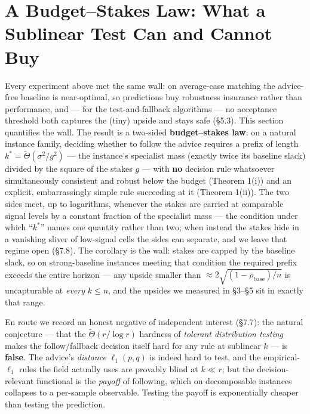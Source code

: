 \section{A Budget--Stakes Law: What a Sublinear Test Can and Cannot
Buy}

Every experiment above met the same wall: on average-case matching the
advice-free baseline is near-optimal, so predictions buy robustness
insurance rather than performance, and --- for the test-and-fallback
algorithms --- no acceptance threshold both captures the (tiny) upside
and stays safe (§5.3). This section quantifies the wall. The result is a
two-sided \textbf{budget--stakes law}: on a natural instance family,
deciding whether to follow the advice requires a prefix of length
\(k^* = \tilde\Theta(\sigma^2/g^2)\) --- the instance's specialist mass
(exactly twice its baseline slack) divided by the square of the stakes
\(g\) --- with \textbf{no} decision rule whatsoever simultaneously
consistent and robust below the budget (Theorem 1(i)) and an explicit,
embarrassingly simple rule succeeding at it (Theorem 1(ii)). The two
sides meet, up to logarithms, whenever the stakes are carried at
comparable signal levels by a constant fraction of the specialist mass
--- the condition under which ``\(k^*\)'' names one quantity rather than
two; when instead the stakes hide in a vanishing sliver of low-signal
cells the sides can separate, and we leave that regime open (§7.8). The
corollary is the wall: stakes are capped by the baseline slack, so on
strong-baseline instances meeting that condition the required prefix
exceeds the entire horizon --- any upside smaller than
\(\approx 2\sqrt{(1-\rho_{\mathrm{base}})/n}\) is uncapturable at
\emph{every} \(k\le n\), and the upsides we measured in §3--§5 sit in
exactly that range.

En route we record an honest negative of independent interest (§7.7):
the natural conjecture --- that the \(\tilde\Theta(r/\log r)\) hardness
of \emph{tolerant distribution testing}
\cite{canonne2022tolerance,valiant2011unseen,jiao2018l1} makes the
follow/fallback decision itself hard for any rule at sublinear \(k\) ---
is \textbf{false}. The advice's \emph{distance} \(\ell_1(p,q)\) is
indeed hard to test, and the empirical-\(\ell_1\) rules the field
actually uses \cite{choo2024imperfect,bem2026testmatch} are provably
blind at \(k \ll r\); but the decision-relevant functional is the
\emph{payoff} of following, which on decomposable instances collapses to
a per-sample observable. Testing the payoff is exponentially cheaper
than testing the prediction.

